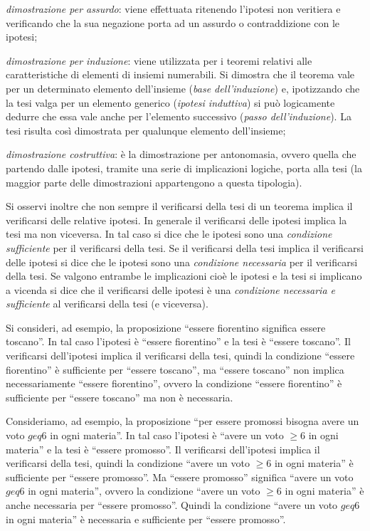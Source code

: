 \begin{itemize*}
\item \emph{dimostrazione per assurdo}: viene effettuata ritenendo l'ipotesi non veritiera e verificando che la sua negazione porta ad un assurdo o contraddizione con le ipotesi;
\item \emph{dimostrazione per induzione}: viene utilizzata per i teoremi relativi alle caratteristiche di elementi di insiemi numerabili. Si dimostra che il teorema vale per un determinato elemento dell'insieme (\emph{base dell'induzione}) e, ipotizzando che la tesi valga per un elemento generico (\emph{ipotesi induttiva}) si può logicamente dedurre che essa vale anche per l'elemento successivo (\emph{passo dell'induzione}). La tesi risulta così dimostrata per qualunque elemento dell'insieme;
\item \emph{dimostrazione costruttiva}: è la dimostrazione per antonomasia, ovvero quella che partendo dalle ipotesi, tramite una serie di implicazioni logiche, porta alla tesi (la maggior parte delle dimostrazioni appartengono a questa tipologia).
\end{itemize*}

Si osservi inoltre che non sempre il verificarsi della tesi di un teorema implica il verificarsi delle relative ipotesi. In generale il verificarsi delle ipotesi implica la tesi ma non viceversa. In tal caso si dice che le ipotesi sono una \emph{condizione sufficiente} per il verificarsi della tesi. Se il verificarsi della tesi implica il verificarsi delle ipotesi si dice che le ipotesi sono una \emph{condizione necessaria} per il verificarsi della tesi. Se valgono entrambe le implicazioni cioè le ipotesi e la tesi si implicano a vicenda si dice che il verificarsi delle ipotesi è una \emph{condizione necessaria e sufficiente} al verificarsi della tesi (e viceversa).

Si consideri, ad esempio, la proposizione ``essere fiorentino significa essere toscano''.
In tal caso l'ipotesi è ``essere fiorentino'' e la tesi è ``essere toscano''. Il verificarsi dell'ipotesi implica il verificarsi della tesi, quindi la condizione ``essere fiorentino'' è sufficiente per ``essere toscano'', ma ``essere toscano'' non implica necessariamente ``essere fiorentino'', ovvero la condizione ``essere fiorentino'' è sufficiente per ``essere toscano'' ma non è necessaria.

Consideriamo, ad esempio, la proposizione ``per essere promossi bisogna avere un voto $geq 6$ in ogni materia''.
In tal caso l'ipotesi è ``avere un voto $\geq 6$ in ogni materia'' e la tesi è ``essere promosso''. Il verificarsi dell'ipotesi implica il verificarsi della tesi, quindi la condizione ``avere un voto $\geq 6$ in ogni materia'' è sufficiente per ``essere promosso''. Ma ``essere promosso'' significa ``avere un voto $geq 6$ in ogni materia'', ovvero la condizione ``avere un voto $\geq 6$ in ogni materia'' è anche necessaria per ``essere promosso''. Quindi la condizione ``avere un voto $geq 6$ in ogni materia'' è necessaria e sufficiente per ``essere promosso''.


